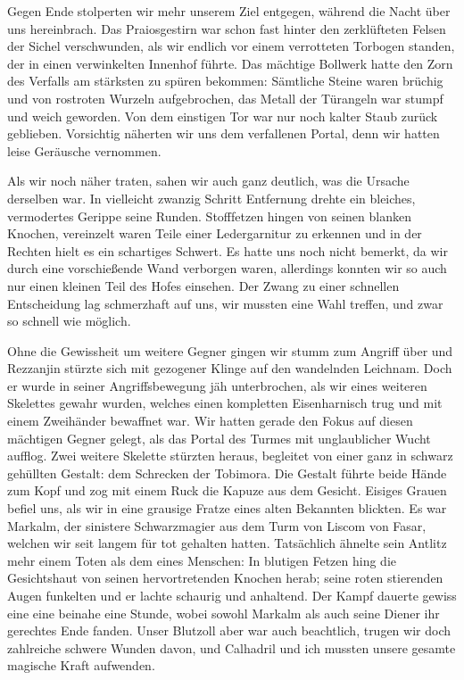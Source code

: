 \documentclass[11pt]{scrreprt}
\begin{document}
Gegen Ende stolperten wir mehr unserem Ziel entgegen, während die Nacht über uns hereinbrach. Das Praiosgestirn war schon fast hinter den zerklüfteten Felsen der Sichel verschwunden, als wir endlich vor einem verrotteten Torbogen standen, der in einen verwinkelten Innenhof führte. Das mächtige Bollwerk hatte den Zorn des Verfalls am stärksten zu spüren bekommen: Sämtliche Steine waren brüchig und von rostroten Wurzeln aufgebrochen, das Metall der Türangeln war stumpf und weich geworden. Von dem einstigen Tor war nur noch kalter Staub zurück geblieben. Vorsichtig näherten wir uns dem verfallenen Portal, denn wir hatten leise Geräusche vernommen.\par

Als wir noch näher traten, sahen wir auch ganz deutlich, was die Ursache derselben war. In vielleicht zwanzig Schritt Entfernung drehte ein bleiches, vermodertes Gerippe seine Runden. Stofffetzen hingen von seinen blanken Knochen, vereinzelt waren Teile einer Ledergarnitur zu erkennen und in der Rechten hielt es ein schartiges Schwert. Es hatte uns noch nicht bemerkt, da wir durch eine vorschießende Wand verborgen waren, allerdings konnten wir so auch nur einen kleinen Teil des Hofes einsehen. Der Zwang zu einer schnellen Entscheidung lag schmerzhaft auf uns, wir mussten eine Wahl treffen, und zwar so schnell wie möglich. \par

Ohne die Gewissheit um weitere Gegner gingen wir stumm zum Angriff über und Rezzanjin stürzte sich mit gezogener Klinge auf den wandelnden Leichnam. Doch er wurde in seiner Angriffsbewegung jäh unterbrochen, als wir eines weiteren Skelettes gewahr wurden, welches einen kompletten Eisenharnisch trug und mit einem Zweihänder bewaffnet war. Wir hatten gerade den Fokus auf diesen mächtigen Gegner gelegt, als das Portal des Turmes mit unglaublicher Wucht aufflog. Zwei weitere Skelette stürzten heraus, begleitet von einer ganz in schwarz gehüllten Gestalt: dem Schrecken der Tobimora. Die Gestalt führte beide Hände zum Kopf und zog mit einem Ruck die Kapuze aus dem Gesicht. Eisiges Grauen befiel uns, als wir in eine grausige Fratze eines alten Bekannten blickten. Es war Markalm, der sinistere Schwarzmagier aus dem Turm von Liscom  von Fasar, welchen wir seit langem für tot gehalten hatten. Tatsächlich ähnelte sein Antlitz mehr einem Toten als dem eines Menschen: In blutigen Fetzen hing die Gesichtshaut von seinen hervortretenden Knochen herab; seine roten stierenden Augen funkelten und er lachte schaurig und anhaltend. Der Kampf dauerte gewiss eine eine beinahe eine Stunde, wobei sowohl Markalm als auch seine Diener ihr gerechtes Ende fanden. Unser Blutzoll aber war auch beachtlich, trugen wir doch zahlreiche schwere Wunden davon, und Calhadril und ich mussten unsere gesamte magische Kraft aufwenden. \par
\end{document}
